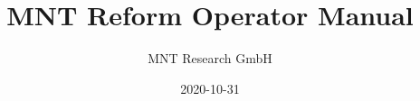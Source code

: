 \documentclass[cmyk]{book}
\title{MNT Reform Operator Manual}
\author{MNT Research GmbH}
\date{2020-10-31}
\begin{document}
\RaggedRight



\tableofcontents

\newpage
\end{document}
